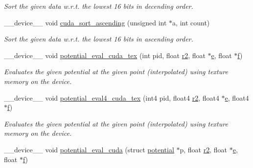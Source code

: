 \begin{DoxyCompactItemize}
\begin{DoxyCompactList}\small\item\em Sort the given data w.\-r.\-t. the lowest 16 bits in decending order. \end{DoxyCompactList}\item 
\-\_\-\-\_\-device\-\_\-\-\_\- void \hyperlink{runner__cuda_8cu_a01c8032e5d4495edadcc8540a36bba7e}{cuda\-\_\-sort\-\_\-ascending} (unsigned int $\ast$a, int count)
\begin{DoxyCompactList}\small\item\em Sort the given data w.\-r.\-t. the lowest 16 bits in ascending order. \end{DoxyCompactList}\item 
\-\_\-\-\_\-device\-\_\-\-\_\- void \hyperlink{runner__cuda_8cu_a4f847a3ee804e94e33154c1b0b3c1d26}{potential\-\_\-eval\-\_\-cuda\-\_\-tex} (int pid, float \hyperlink{potential__eval_8h_aaa7f6ac275af5eb6de39bc858a218035}{r2}, float $\ast$\hyperlink{potential__eval_8h_ad93203f13cbfb07bd361e3b37b092fff}{e}, float $\ast$\hyperlink{potential__eval_8h_a1f01162d8c9ffd5a2c09c3c61cc8ef43}{f})
\begin{DoxyCompactList}\small\item\em Evaluates the given potential at the given point (interpolated) using texture memory on the device. \end{DoxyCompactList}\item 
\-\_\-\-\_\-device\-\_\-\-\_\- void \hyperlink{runner__cuda_8cu_ad7ac64705f23cc0ce5d9d73369162309}{potential\-\_\-eval4\-\_\-cuda\-\_\-tex} (int4 pid, float4 \hyperlink{potential__eval_8h_aaa7f6ac275af5eb6de39bc858a218035}{r2}, float4 $\ast$\hyperlink{potential__eval_8h_ad93203f13cbfb07bd361e3b37b092fff}{e}, float4 $\ast$\hyperlink{potential__eval_8h_a1f01162d8c9ffd5a2c09c3c61cc8ef43}{f})
\begin{DoxyCompactList}\small\item\em Evaluates the given potential at the given point (interpolated) using texture memory on the device. \end{DoxyCompactList}\item 
\-\_\-\-\_\-device\-\_\-\-\_\- void \hyperlink{runner__cuda_8cu_a84663dbc518d6061f158eee8652d1c45}{potential\-\_\-eval\-\_\-cuda} (struct \hyperlink{structpotential}{potential} $\ast$p, float \hyperlink{potential__eval_8h_aaa7f6ac275af5eb6de39bc858a218035}{r2}, float $\ast$\hyperlink{potential__eval_8h_ad93203f13cbfb07bd361e3b37b092fff}{e}, float $\ast$\hyperlink{potential__eval_8h_a1f01162d8c9ffd5a2c09c3c61cc8ef43}{f})

\end{DoxyCompactItemize}
